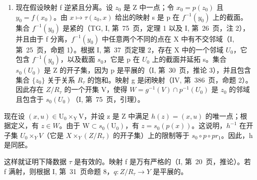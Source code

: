 \begin{enumerate}
\def\labelenumi{\alph{enumi})}
\setcounter{enumi}{1}
\tightlist
\item
  现在假设映射 f 逆紧且分离。设 \(z_{0}\) 是 Z 中一点；令 \(x_{0}=p(z_{0})\) 且 \(y_{0}=f(x_{0})\)。由 \(x\mapsto\tau(z_{0},x)\) 给出的映射 s 是 p 在 \(f^{-1}(y_{0})\) 上的截面。集合 \(f^{-1}(y_{0})\) 是紧的（TG, I, 第~75~页，定理 1 以及 I, 第~26~页，注 2），并且由于 f 分离，\(f^{-1}(y_{0})\) 中任意两个不同的点在 X 中有不交邻域（I, 第~25~页，命题 1）。根据 I, 第~37~页定理 2，存在 X 中的一个邻域 \(U_{0}\)，它包含 \(f^{-1}(y_{0})\)，以及截面 \(s_{0}\)，它是 p 在 \(U_{0}\) 上的截面并延拓 s。集合 \(s_{0}(U_{0})\) 是 Z 的开子集，因为 p 是平展的（I, 第~30~页，推论 3），并且包含集合 \(\{z_{0}\}\) 关于关系 \(R_{\tau}\) 的饱和。映射 g 是闭映射（IV, 第~386~页，命题 2）。因此存在 \(Z/R_{\tau}\) 的一个开集 V，使得 \(W = g^{-1}(V) \cap p^{-1}(U_{0})\) 是 \(z_{0}\) 的邻域且包含于 \(s_{0}(U_{0})\)（I, 第~75~页，引理）。
\end{enumerate}

现在设 \((x,u)\in\mathrm{U}_{0}\times_{\mathrm{Y}}\mathrm{V}\)，并设 z 是 Z 中满足 \(h(z)=(x,u)\) 的唯一点；根据定义，有 \(z\in W\)。由于 \(\mathrm{W}\subset s_{0}(\mathrm{U}_{0})\)，有 \(z=s_{0}(p(x))\)。这说明，\(h^{-1}\) 在开子集 \(U_{0}\times_{Y}V\)（它是 \(X\times_{Y}(Z/R_{\tau})\) 的开子集）上的限制等于 \(s_{0}\circ p\circ pr_{1}\)。因此，h 是同胚。

这样就证明下降数据 \(\tau\) 是有效的。映射 f 是万有严格的（I, 第~20~页，推论）。若 f 满射，则根据 I, 第~31~页命题 8，\(q: Z/R_{\tau} \to Y\) 是平展的。


